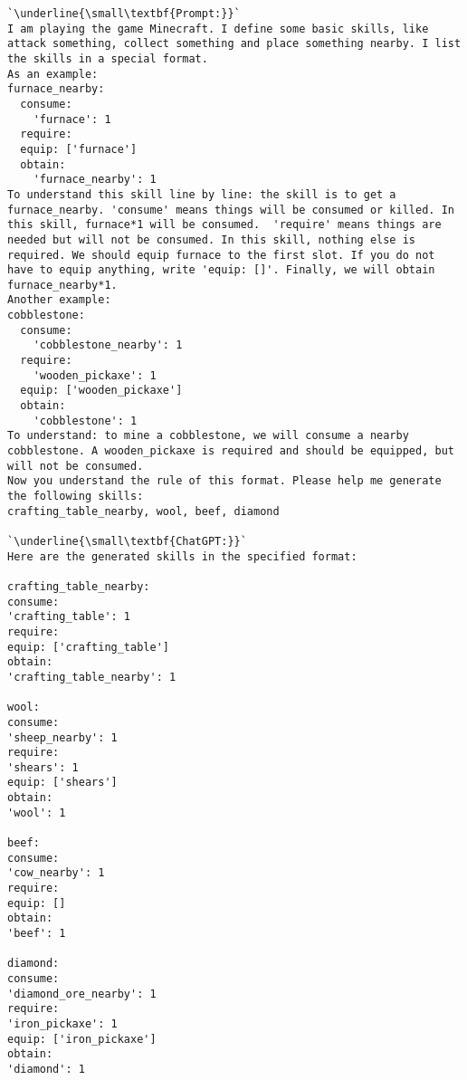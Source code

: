 \documentclass{article}
\begin{document}
\begin{lstlisting}[caption=Prompt for generating some Manipulation-skills and ChatGPT's response. We only modify the last querying sentence in the prompt to generate all the skills. ]
`\underline{\small\textbf{Prompt:}}` 
I am playing the game Minecraft. I define some basic skills, like attack something, collect something and place something nearby. I list the skills in a special format. 
As an example:
furnace_nearby:
  consume: 
    'furnace': 1
  require: 
  equip: ['furnace']
  obtain: 
    'furnace_nearby': 1
To understand this skill line by line: the skill is to get a furnace_nearby. 'consume' means things will be consumed or killed. In this skill, furnace*1 will be consumed.  'require' means things are needed but will not be consumed. In this skill, nothing else is required. We should equip furnace to the first slot. If you do not have to equip anything, write 'equip: []'. Finally, we will obtain furnace_nearby*1. 
Another example:
cobblestone:
  consume: 
    'cobblestone_nearby': 1
  require: 
    'wooden_pickaxe': 1
  equip: ['wooden_pickaxe']
  obtain: 
    'cobblestone': 1
To understand: to mine a cobblestone, we will consume a nearby cobblestone. A wooden_pickaxe is required and should be equipped, but will not be consumed.
Now you understand the rule of this format. Please help me generate the following skills:
crafting_table_nearby, wool, beef, diamond

`\underline{\small\textbf{ChatGPT:}}`
Here are the generated skills in the specified format:

crafting_table_nearby:
consume:
'crafting_table': 1
require:
equip: ['crafting_table']
obtain:
'crafting_table_nearby': 1

wool:
consume:
'sheep_nearby': 1
require:
'shears': 1
equip: ['shears']
obtain:
'wool': 1

beef:
consume:
'cow_nearby': 1
require:
equip: []
obtain:
'beef': 1

diamond:
consume:
'diamond_ore_nearby': 1
require:
'iron_pickaxe': 1
equip: ['iron_pickaxe']
obtain:
'diamond': 1
\end{lstlisting}
\end{document}
